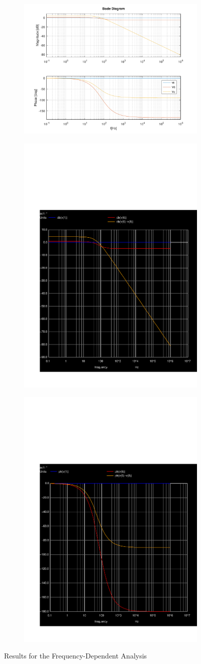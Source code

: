 \begin{figure}
\centering
\begin{subfigure}{.5\textwidth}
  \centering
  \includegraphics[width=.4\linewidth]{../mat/t2-t6.pdf}
\end{subfigure}%
\begin{subfigure}{.5\textwidth}
  \centering
  \includegraphics[width=.4\linewidth]{../sim/db.pdf}
\end{subfigure}
\begin{subfigure}{.5\textwidth}
  \centering
  \includegraphics[width=.4\linewidth]{../sim/ph.pdf}
\end{subfigure}
\caption{Results for the Frequency-Dependent Analysis}
\end{figure}